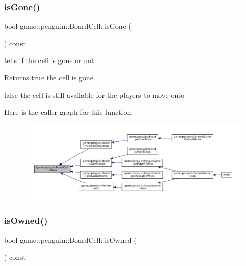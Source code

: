 \subsubsection{\texorpdfstring{is\+Gone()}{isGone()}}
{\footnotesize\ttfamily bool game\+::penguin\+::\+Board\+Cell\+::is\+Gone (\begin{DoxyParamCaption}{ }\end{DoxyParamCaption}) const\hspace{0.3cm}{\ttfamily [inline]}}



tells if the cell is gone or not 

\begin{DoxyReturn}{Returns}
true the cell is gone 

false the cell is still available for the players to move onto 
\end{DoxyReturn}
Here is the caller graph for this function\+:
\nopagebreak
\begin{figure}[H]
\begin{center}
\leavevmode
\includegraphics[width=350pt]{classgame_1_1penguin_1_1_board_cell_a6a978b7e72ef20475771eb6e453e0a39_icgraph}
\end{center}
\end{figure}
\mbox{\label{classgame_1_1penguin_1_1_board_cell_a12cd55e333821bcecaa201dde758c1a1}} 
\subsubsection{\texorpdfstring{is\+Owned()}{isOwned()}}
{\footnotesize\ttfamily bool game\+::penguin\+::\+Board\+Cell\+::is\+Owned (\begin{DoxyParamCaption}{ }\end{DoxyParamCaption}) const\hspace{0.3cm}{\ttfamily [inline]}}



